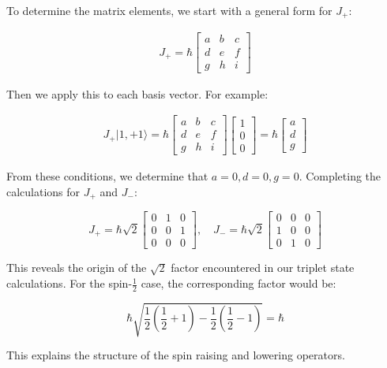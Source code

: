 To determine the matrix elements, we start with a general form for $J_+$:

\begin{gather}
J_{+}=\hbar\left[\begin{array}{lll}
a & b & c \\
d & e & f \\
g & h & i
\end{array}\right]
\end{gather}

Then we apply this to each basis vector. For example:

\begin{gather}
J_{+}|1,+1\rangle=\hbar\left[\begin{array}{lll}
a & b & c \\
d & e & f \\
g & h & i
\end{array}\right]\left[\begin{array}{l}
1 \\
0 \\
0
\end{array}\right]=\hbar\left[\begin{array}{l}
a \\
d \\
g
\end{array}\right]
\end{gather}


From these conditions, we determine that $a=0, d=0, g=0$. Completing the calculations for $J_+$ and $J_-$:

\[
J_{+}=\hbar \sqrt{2}\left[\begin{array}{lll}
0 & 1 & 0  \\
0 & 0 & 1 \\
0 & 0 & 0
\end{array}\right], \quad J_{-}=\hbar \sqrt{2}\left[\begin{array}{lll}
0 & 0 & 0 \\
1 & 0 & 0 \\
0 & 1 & 0
\end{array}\right]
\]

This reveals the origin of the $\sqrt{2}$ factor encountered in our triplet state calculations. For the spin-$\frac{1}{2}$ case, the corresponding factor would be:

\begin{equation}
\hbar \sqrt{\frac{1}{2}(\frac{1}{2}+1)-\frac{1}{2}(\frac{1}{2}-1)}=\hbar
\end{equation}

This explains the structure of the spin raising and lowering operators.
